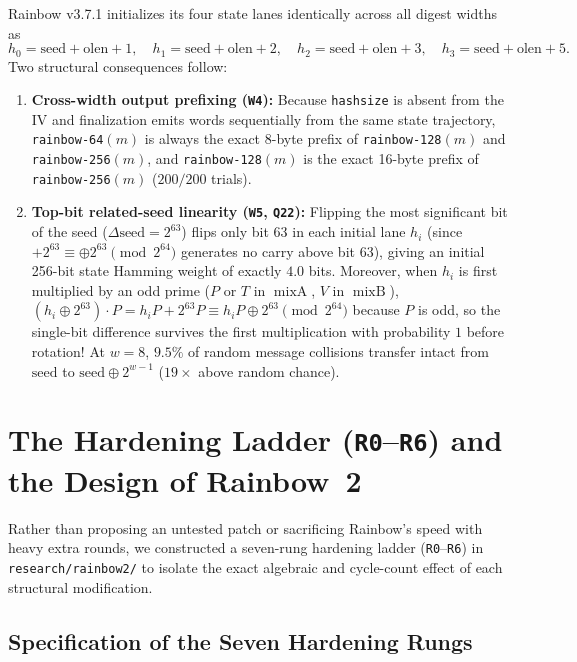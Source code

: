 \documentclass[10pt]{article}
\theoremstyle{definition}
\newcommand{\mixA}{\operatorname{mixA}}
\newcommand{\mixB}{\operatorname{mixB}}
\newcommand{\code}[1]{\texttt{#1}}
\begin{document}
Rainbow v3.7.1 initializes its four state lanes identically across all digest widths as
\[
  h_0 = \text{seed} + \text{olen} + 1,\quad h_1 = \text{seed} + \text{olen} + 2,\quad h_2 = \text{seed} + \text{olen} + 3,\quad h_3 = \text{seed} + \text{olen} + 5.
\]
Two structural consequences follow:
\begin{enumerate}
  \item \textbf{Cross-width output prefixing (\code{W4}):} Because \code{hashsize} is absent from the IV and finalization emits words sequentially from the same state trajectory, \code{rainbow-64}$(m)$ is always the exact 8-byte prefix of \code{rainbow-128}$(m)$ and \code{rainbow-256}$(m)$, and \code{rainbow-128}$(m)$ is the exact 16-byte prefix of \code{rainbow-256}$(m)$ ($200/200$ trials).
  \item \textbf{Top-bit related-seed linearity (\code{W5}, \code{Q22}):} Flipping the most significant bit of the seed ($\Delta\text{seed} = 2^{63}$) flips only bit 63 in each initial lane $h_i$ (since $+2^{63} \equiv \oplus 2^{63} \pmod{2^{64}}$ generates no carry above bit 63), giving an initial 256-bit state Hamming weight of exactly $4.0$ bits. Moreover, when $h_i$ is first multiplied by an odd prime ($P$ or $T$ in $\mixA$, $V$ in $\mixB$), $(h_i \oplus 2^{63}) \cdot P = h_i P + 2^{63} P \equiv h_i P \oplus 2^{63} \pmod{2^{64}}$ because $P$ is odd, so the single-bit difference survives the first multiplication with probability $1$ before rotation! At $w=8$, $9.5\%$ of random message collisions transfer intact from $\text{seed}$ to $\text{seed} \oplus 2^{w-1}$ ($19\times$ above random chance).
\end{enumerate}

\section{The Hardening Ladder (\code{R0}--\code{R6}) and the Design of Rainbow~2}
\label{sec:ladder}

Rather than proposing an untested patch or sacrificing Rainbow's speed with heavy extra rounds, we constructed a seven-rung hardening ladder (\code{R0}--\code{R6}) in \code{research/rainbow2/} to isolate the exact algebraic and cycle-count effect of each structural modification.

\subsection{Specification of the Seven Hardening Rungs}
\label{sec:rungs}
\end{document}
